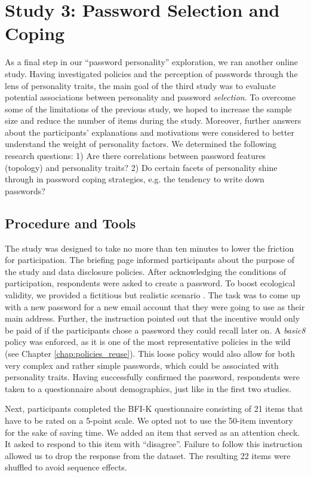 \section{Study 3: Password Selection and Coping}\label{sec:personality:study3}
As a final step in our ``password personality'' exploration, we ran another online study. Having investigated policies and the perception of passwords through the lens of personality traits, the main goal of the third study was to evaluate potential associations between personality and password \textit{selection}. To overcome some of the limitations of the previous study, we hoped to increase the sample size and reduce the number of items during the study. Moreover, further answers about the participants' explanations and motivations were considered to better understand the weight of personality factors. We determined the following research questions: 1) Are there correlations between password features (topology) and personality traits? 2) Do certain facets of personality shine through in password coping strategies, e.g. the tendency to write down passwords?

\subsection{Procedure and Tools}
The study was designed to take no more than ten minutes to lower the friction for participation. The briefing page informed participants about the purpose of the study and data disclosure policies. After acknowledging the conditions of participation, respondents were asked to create a password. To boost ecological validity, we provided a fictitious but realistic scenario \cite{Komanduri2011OfPasswordsAndPeople}. The task was to come up with a new password for a new email account that they were going to use as their main address. Further, the instruction pointed out that the incentive would only be paid of if the participants chose a password they could recall later on. A \textit{basic8} policy was enforced, as it is one of the most representative policies in the wild (see Chapter \ref{chap:policies_reuse}). This loose policy would also allow for both very complex and rather simple passwords, which could be associated with personality traits. Having successfully confirmed the password, respondents were taken to a questionnaire about demographics, just like in the first two studies. 

Next, participants completed the BFI-K questionnaire consisting of 21 items that have to be rated on a 5-point scale. We opted not to use the 50-item inventory for the sake of saving time. We added an item that served as an attention check. It asked to respond to this item with ``disagree''. Failure to follow this instruction allowed us to drop the response from the dataset. The resulting 22 items were shuffled to avoid sequence effects. 

